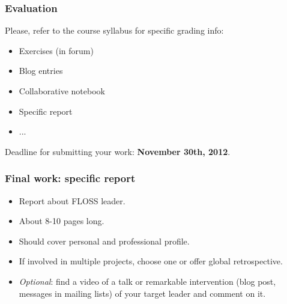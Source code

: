 \documentclass{beamer}
\begin{document}

\begin{frame}
\frametitle{Evaluation}

Please, refer to the course syllabus for specific grading info:
\begin{itemize}
\item Exercises (in forum)
\item Blog entries
\item Collaborative notebook
\item Specific report
\item ...
\end{itemize}

Deadline for submitting your work: \textbf{November 30th, 2012}.

\end{frame}


\begin{frame}
\frametitle{Final work: specific report}

\begin{itemize}
\item Report about FLOSS leader.
\item About 8-10 pages long.
\item Should cover personal and professional profile.
\item If involved in multiple projects, choose one or offer global retrospective.
\item \textit{Optional}: find a video of a talk or remarkable intervention (blog post, messages in mailing lists) of your target leader 
and comment on it.
\end{itemize}

\end{frame}


% 
% 

\end{document}
